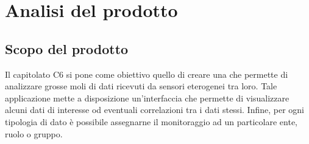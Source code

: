 \section{Analisi del prodotto}
	\subsection{Scopo del prodotto}
		Il capitolato C6 si pone come obiettivo quello di creare una  che permette di analizzare grosse moli di dati ricevuti da sensori eterogenei tra loro. Tale applicazione mette a disposizione un'interfaccia che permette di visualizzare alcuni dati di interesse od eventuali correlazioni tra i dati stessi. Infine, per ogni tipologia di dato è possibile assegnarne il monitoraggio ad un particolare ente, ruolo o gruppo.
		
